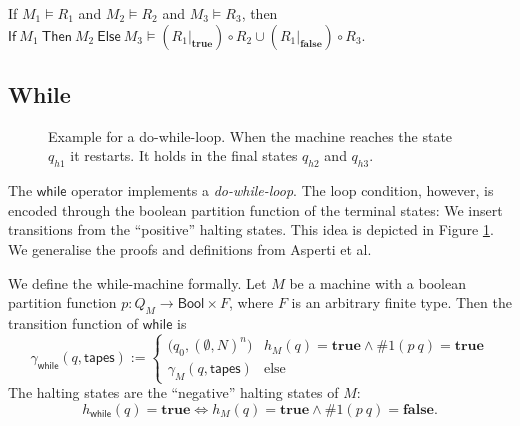 \documentclass{psartcl}
\renewcommand{\vDash}{\models} \DeclareRobustCommand{\VDash}{\mathrel{|\mkern-2mu|}\joinrel \Relbar}
\newcommand{\txt}[1]{\text{#1}} %
\newcommand{\MS}[1]{\textsf{#1}}
\newcommand{\from}{:}
\renewcommand{\to}{\rightarrow}
\newcommand{\Bool}{\MS{Bool}}
\renewcommand{\None}{\emptyset}
\newcommand{\true}{\mathbf{true}}
\newcommand{\false}{\mathbf{false}}
\newcommand{\at}[2][]{#1|_{#2}}
\newcommand{\mif}[3]{\MS{If}~#1~\MS{Then}~#2~\MS{Else}~#3}
\begin{document}
\begin{corollary}
  \label{lem:if}
  If $M_1 \vDash R_1$ and $M_2 \vDash R_2$ and $M_3 \vDash R_3$, then
  $\mif{M_1}{M_2}{M_3} \vDash (R_1 \at \true) \circ R_2 \cup (R_1 \at \false) \circ R_3$.
\end{corollary}


\subsection{While}

\begin{figure}
  \center
  \caption{Example for a do-while-loop.  When the machine reaches the state $q_{h1}$ it restarts.  It holds in the final states $q_{h2}$ and $q_{h3}$.}
  \label{fig:while-example}
\end{figure}

The $\MS{while}$ operator implements a \emph{do-while-loop}.  The loop condition, however, is encoded through the boolean partition
function of the terminal states:  We insert transitions from the ``positive'' halting states.  This idea is depicted in Figure
\ref{fig:while-example}.  We generalise the proofs and definitions from Asperti et al.

We define the while-machine formally.  Let $M$ be a machine with a boolean partition function $p \from Q_M \to \Bool \times F$, where $F$ is an
arbitrary finite type.  Then the transition function of $\MS{while}$ is
$$\gamma_{\MS{while}} (q, \MS{tapes}) :=
  \begin{cases}
    \bigl( q_0, (\None, N)^n \bigr) & h_M(q) = \true \land \#1(p~q) = \true \\
    \gamma_M(q, \MS{tapes})           & \txt{else}
  \end{cases} $$
The halting states are the ``negative'' halting states of $M$:
$$h_{\MS{while}}(q) = \true \iff h_M(q) = \true \land \#1(p~q) = \false.$$
\end{document}

